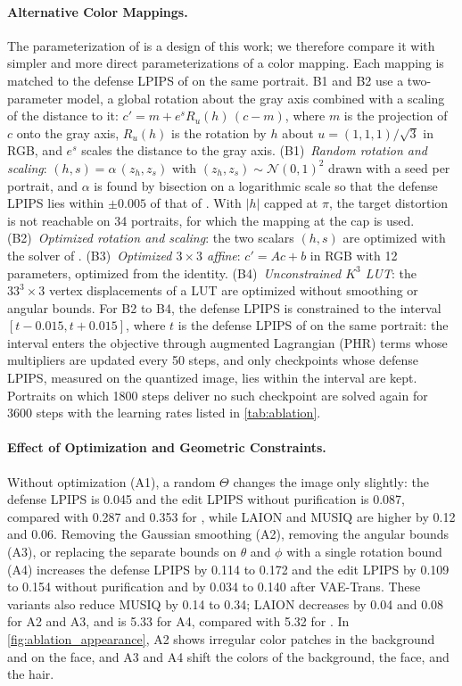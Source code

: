 \paragraph{Alternative Color Mappings.} The parameterization of \capg{} is a design of this work; we therefore compare it with simpler and more direct parameterizations of a color mapping. Each mapping is matched to the defense LPIPS of \capg{} on the same portrait.
B1 and B2 use a two-parameter model, a global rotation about the gray axis combined with a scaling of the distance to it: $c' = m + e^{s} R_u(h)\,(c - m)$, where $m$ is the projection of $c$ onto the gray axis, $R_u(h)$ is the rotation by $h$ about $u = (1, 1, 1)/\sqrt{3}$ in RGB, and $e^{s}$ scales the distance to the gray axis.
(B1)~\emph{Random rotation and scaling}: $(h, s) = \alpha\,(z_h, z_s)$ with $(z_h, z_s) \sim \mathcal{N}(0, 1)^2$ drawn with a seed per portrait, and $\alpha$ is found by bisection on a logarithmic scale so that the defense LPIPS lies within $\pm 0.005$ of that of \capg{}. With $|h|$ capped at $\pi$, the target distortion is not reachable on 34 portraits, for which the mapping at the cap is used.
(B2)~\emph{Optimized rotation and scaling}: the two scalars $(h, s)$ are optimized with the solver of \capg{}.
(B3)~\emph{Optimized $3\times3$ affine}: $c' = A c + b$ in RGB with 12 parameters, optimized from the identity.
(B4)~\emph{Unconstrained $K^3$ LUT}: the $33^3 \times 3$ vertex displacements of a LUT are optimized without smoothing or angular bounds.
For B2 to B4, the defense LPIPS is constrained to the interval $[t - 0.015, t + 0.015]$, where $t$ is the defense LPIPS of \capg{} on the same portrait: the interval enters the objective through augmented Lagrangian (PHR) terms whose multipliers are updated every 50 steps, and only checkpoints whose defense LPIPS, measured on the quantized image, lies within the interval are kept. Portraits on which 1800 steps deliver no such checkpoint are solved again for 3600 steps with the learning rates listed in \cref{tab:ablation}.

\paragraph{Effect of Optimization and Geometric Constraints.} Without optimization (A1), a random $\Theta$ changes the image only slightly: the defense LPIPS is 0.045 and the edit LPIPS without purification is 0.087, compared with 0.287 and 0.353 for \capg{}, while LAION and MUSIQ are higher by 0.12 and 0.06. Removing the Gaussian smoothing (A2), removing the angular bounds (A3), or replacing the separate bounds on $\theta$ and $\phi$ with a single rotation bound (A4) increases the defense LPIPS by 0.114 to 0.172 and the edit LPIPS by 0.109 to 0.154 without purification and by 0.034 to 0.140 after VAE-Trans. These variants also reduce MUSIQ by 0.14 to 0.34; LAION decreases by 0.04 and 0.08 for A2 and A3, and is 5.33 for A4, compared with 5.32 for \capg{}. In \cref{fig:ablation_appearance}, A2 shows irregular color patches in the background and on the face, and A3 and A4 shift the colors of the background, the face, and the hair.

